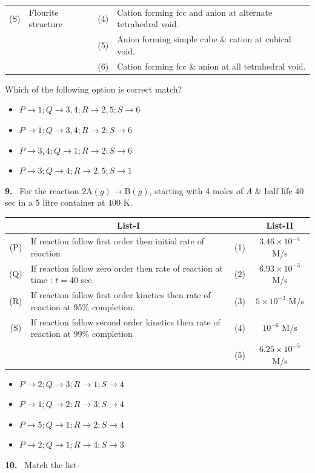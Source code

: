 \documentclass[10pt]{extarticle}
\newcommand{\qn}[1]{\par\smallskip\noindent\textbf{#1.}~}
\newenvironment{qoptions}{\begin{itemize}[leftmargin=1.8em,itemsep=1pt,topsep=2pt,label={}]}{\end{itemize}}
\newcommand{\opt}[2]{\item[(#1)] #2}
\begin{document}
\begin{multicols}{2}
\begin{center}
\begin{tabular}{|c|l|c|l|}
(S) & Flourite structure & (4) & \parbox[t]{3.1cm}{Cation forming fcc and anion at alternate tetrahedral void.}\\[3pt]
 & & (5) & \parbox[t]{3.1cm}{Anion forming simple cube \& cation at cubical void.}\\[3pt]
 & & (6) & \parbox[t]{3.1cm}{Cation forming fcc \& anion at all tetrahedral void.}\\[3pt]
\hline
\end{tabular}
\end{center}
Which of the following option is correct match?
\begin{qoptions}
\opt{A}{$P\to1;Q\to3,4;R\to2,5;S\to6$}
\opt{B}{$P\to1;Q\to3,4;R\to2;S\to6$}
\opt{C}{$P\to3,4;Q\to1;R\to2;S\to6$}
\opt{D}{$P\to3;Q\to4;R\to2,5;S\to1$}
\end{qoptions}
\qn{9} For the reaction $2\mathrm A(g)\to\mathrm B(g)$, starting with 4 moles of $A$ \& half life 40 sec in a 5 litre container at 400 K.
\begin{center}\small\renewcommand{\arraystretch}{1.1}\setlength{\extrarowheight}{3.5pt}\setlength{\tabcolsep}{3pt}
\begin{tabular}{|c|l|c|c|}
\hline
 & \multicolumn{1}{c|}{List-I} & & List-II\\[3pt]
\hline
(P) & \parbox[t]{4cm}{If reaction follow first order then initial rate of reaction} & (1) & $3.46\times10^{-4}$ M/s\\[3pt]
(Q) & \parbox[t]{4cm}{If reaction follow zero order then rate of reaction at time : $t=40$ sec.} & (2) & $6.93\times10^{-3}$ M/s\\[3pt]
(R) & \parbox[t]{4cm}{If reaction follow first order kinetics then rate of reaction at 95\% completion.} & (3) & $5\times10^{-3}$ M/s\\[3pt]
(S) & \parbox[t]{4cm}{If reaction follow second order kinetics then rate of reaction at 99\% completion} & (4) & $10^{-6}$ M/s\\[3pt]
 & & (5) & $6.25\times10^{-5}$ M/s\\[3pt]
\hline
\end{tabular}
\end{center}
\begin{qoptions}
\opt{A}{$P\to2;Q\to3;R\to1;S\to4$}
\opt{B}{$P\to1;Q\to2;R\to3;S\to4$}
\opt{C}{$P\to5;Q\to1;R\to2;S\to4$}
\opt{D}{$P\to2;Q\to1;R\to4;S\to3$}
\end{qoptions}
\qn{10} Match the list-
\begin{center}\small\renewcommand{\arraystretch}{1.1}\setlength{\extrarowheight}{3.5pt}\setlength{\tabcolsep}{3pt}

\end{center}
\end{multicols}
\end{document}
